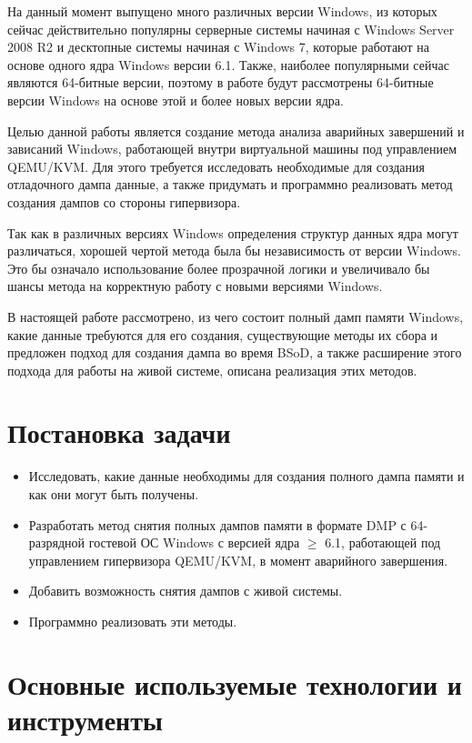 \documentclass{mipt-thesis-bs}
\begin{document}
На данный момент выпущено много различных версии Windows, из которых сейчас действительно популярны серверные системы начиная с Windows Server 2008 R2 и десктопные системы начиная с Windows 7, которые работают на основе одного ядра Windows версии 6.1. Также, наиболее популярными сейчас являются 64-битные версии, поэтому в работе будут рассмотрены 64-битные версии Windows на основе этой и более новых версии ядра.

Целью данной работы является создание метода анализа аварийных завершений и зависаний Windows, работающей внутри виртуальной машины под управлением QEMU/KVM. Для этого требуется исследовать необходимые для создания отладочного дампа данные, а также придумать и программно реализовать метод создания дампов со стороны гипервизора.

Так как в различных версиях Windows определения структур данных ядра могут различаться\cite{kprcb}\cite{win10-struct}, хорошей чертой метода была бы независимость от версии Windows. Это бы означало использование более прозрачной логики и увеличивало бы шансы метода на корректную работу с новыми версиями Windows.

В настоящей работе рассмотрено, из чего состоит полный дамп памяти Windows, какие данные требуются для его создания, существующие методы их сбора и предложен подход для создания дампа во время BSoD, а также расширение этого подхода для работы на живой системе, описана реализация этих методов.

\chapter{Постановка задачи}

\begin{itemize}
\item Исследовать, какие данные необходимы для создания полного дампа памяти и как они могут быть получены.
\item Разработать метод снятия полных дампов памяти в формате DMP с 64-разрядной гостевой ОС Windows с версией ядра $\geqslant$ 6.1, работающей под управлением гипервизора QEMU/KVM, в момент аварийного завершения.
\item Добавить возможность снятия дампов с живой системы.
\item Программно реализовать эти методы.
\end{itemize}

\chapter{Основные используемые технологии и инструменты}
\end{document}

